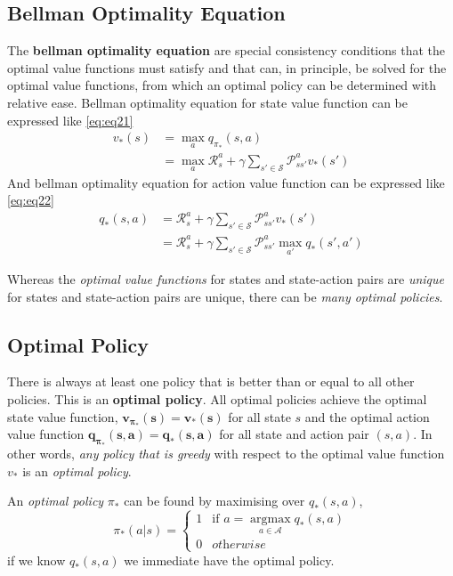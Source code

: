 \documentclass[
	10pt, %
]{article}
\newcommand{\mc}[1]{\mathcal{#1}}
\newcommand{\tb}[1]{\textbf{#1}}
\newcommand{\ti}[1]{\textit{#1}}
\numberwithin{equation}{subsection} %
\newcommand{\argmax}{\mathop{\mathrm{argmax}}\limits}
\begin{document}
\subsection{Bellman Optimality Equation}
The \tb{bellman optimality equation} are special consistency conditions that the optimal value functions must satisfy and that can, in principle, be solved for the optimal value functions, from which an optimal policy can be determined with relative ease. Bellman optimality equation for state value function can be expressed like \cref{eq:eq21}
\begin{equation} \label{eq:eq21}
    \begin{aligned}
        v_*(s) &= \max_{a}q_{\pi_*}(s,a)\\
        &=\max_a \mc{R}^a_{s} + \gamma \sum_{s' \in \mc{S}}\mc{P}^a_{ss'}v_*(s')
    \end{aligned}
\end{equation}
And bellman optimality equation for action value function can be expressed like \cref{eq:eq22}
\begin{equation} \label{eq:eq22}
    \begin{aligned}
        q_*(s,a) &= \mc{R}^a_{s} + \gamma \sum_{s' \in \mc{S}} \mc{P}^a_{ss'}v_*(s') \\
        &= \mc{R}^a_{s} + \gamma \sum_{s' \in \mc{S}} \mc{P}^a_{ss'} \max_{a'} q_*(s',a')
    \end{aligned}
\end{equation}



Whereas the \ti{optimal value functions} for states and state-action pairs are \ti{unique} for states and state-action pairs are unique, there can be \ti{many optimal policies}.

\subsection{Optimal Policy}
There is always at least one policy that is better than or equal to all other policies. This is an \tb{optimal policy}. All optimal policies achieve the optimal state value function, $\bm{v_{\pi_*}(s) = v_*(s)}$ for all state $s$ and the optimal action value function $\bm{q_{\pi_*}(s,a) = q_*(s,a)}$ for all state and action pair $(s,a)$. In other words, \ti{any policy that is greedy} with respect to the optimal value function $v_*$ is an \ti{optimal policy}.

An \ti{optimal policy} $\pi_*$ can be found by maximising over $q_*(s,a)$,
\begin{equation}
    \pi_*(a|s) = 
    \begin{cases}
        1 & \text{if } a = \argmax_{a \in \mc{A}}q_*(s,a) \\
        0 & \ti{otherwise}
    \end{cases}
\end{equation}
if we know $q_*(s,a)$ we immediate have the optimal policy.
\newpage
\end{document}
